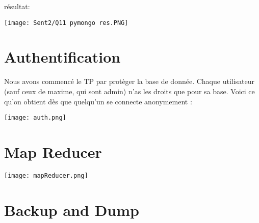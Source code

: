 \documentclass{article}
\begin{document}
résultat:
\begin{center}
	\texttt{[image: Sent2/Q11 pymongo res.PNG]}
\end{center}

\section{Authentification}
Nous avons commencé le TP par protèger la base de donnée. 
Chaque utilisateur (sauf ceux de maxime, qui sont admin) 
n'as les droits que pour sa base. Voici ce qu'on obtient 
dès que quelqu'un se connecte anonymement :

\begin{center}
	\texttt{[image: auth.png]}
\end{center}

\section{Map Reducer}

\begin{center}
	\texttt{[image: mapReducer.png]}
\end{center}

\section{Backup and Dump}
\end{document}
